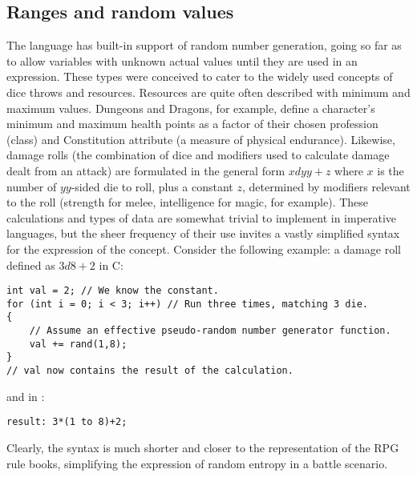 \subsection{Ranges and random values}
The language has built-in support of random number generation, going so far as to allow variables with unknown actual values until they are used in an expression. These types were conceived to cater to the widely used concepts of dice throws and resources. Resources are quite often described with minimum and maximum values. Dungeons and Dragons, for example, define a character's minimum and maximum health points as a factor of their chosen profession (class) and Constitution attribute (a measure of physical endurance). Likewise, damage rolls (the combination of dice and modifiers used to calculate damage dealt from an attack) are formulated in the general form $xdyy+z$ where $x$ is the number of $yy$-sided die to roll, plus a constant $z$, determined by modifiers relevant to the roll (strength for melee, intelligence for magic, for example). These calculations and types of data are somewhat trivial to implement in imperative languages, but the sheer frequency of their use invites a vastly simplified syntax for the expression of the concept. Consider the following example: a damage roll defined as $3d8+2$ in C:
\begin{lstlisting}
int val = 2; // We know the constant.
for (int i = 0; i < 3; i++) // Run three times, matching 3 die.
{
    // Assume an effective pseudo-random number generator function.
    val += rand(1,8);
}
// val now contains the result of the calculation.
\end{lstlisting}
and in \langname:
\begin{lstlisting}
result: 3*(1 to 8)+2;
\end{lstlisting}


Clearly, the \langname syntax is much shorter and closer to the representation of the RPG rule books, simplifying the expression of random entropy  in a battle scenario.

